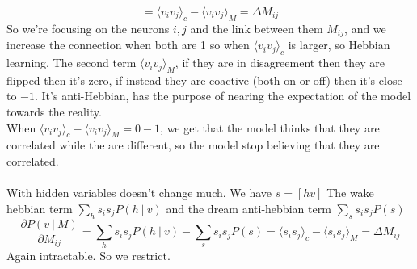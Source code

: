 \documentclass[10pt]{report}
\begin{document}
$$=\langle v_iv_j\rangle_c - \langle v_iv_j\rangle_M = \Delta M_{ij}$$
So we're focusing on the neurons $i, j$ and the link between them $M_{ij}$, and we increase the connection when both are 1 so when $\langle v_iv_j\rangle_c$ is larger, so Hebbian learning. The second term $\langle v_iv_j\rangle_M$, if they are in disagreement then they are flipped then it's zero, if instead they are coactive (both on or off) then it's close to $-1$. It's anti-Hebbian, has the purpose of nearing the expectation of the model towards the reality.\\
When $\langle v_iv_j\rangle_c - \langle v_iv_j\rangle_M = 0-1$, we get that the model thinks that they are correlated while the are different, so the model stop believing that they are correlated.\\\\
With hidden variables doesn't change much. We have $s=[hv]$
The wake hebbian term $\sum_h s_is_jP(h\:|\:v)$ and the dream anti-hebbian term $\sum_ss_is_jP(s)$
$$\frac{\partial P(v\:|\:M)}{\partial M_{ij}} = \sum_h s_is_jP(h\:|\:v) - \sum_ss_is_jP(s) = \langle s_is_j\rangle_c - \langle s_is_j\rangle_M = \Delta M_{ij}$$
Again intractable. So we restrict.
\end{document}
